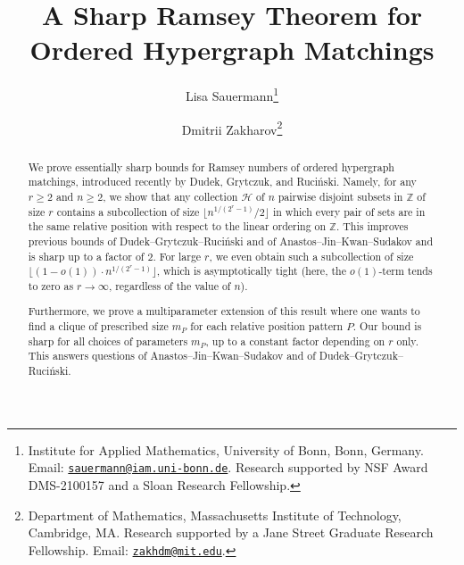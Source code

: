 \documentclass{aic}
\theoremstyle{definition}
\numberwithin{equation}{section}
\numberwithin{figure}{section}
\newcommand{\Z}{\mathbb{Z}}
\newcommand{\HH}{\mathcal{H}}
\begin{document}
\begin{frontmatter}[classification=text]

\title{A Sharp Ramsey Theorem for Ordered Hypergraph Matchings} %

\author[pgom]{Lisa Sauermann\thanks{Institute for Applied Mathematics, University of Bonn, Bonn, Germany. Email: \href{sauermann@iam.uni-bonn.de}{\nolinkurl{sauermann@iam.uni-bonn.de}}. Research supported by NSF Award DMS-2100157 and a Sloan Research Fellowship.}}
\author[johan]{Dmitrii Zakharov\thanks{Department of Mathematics, Massachusetts Institute of Technology, Cambridge, MA.  Research supported by a Jane Street Graduate Research Fellowship. 
Email: \href{zakhdm@mit.edu}{\nolinkurl{zakhdm@mit.edu}}.}}


\begin{abstract}
We prove essentially sharp bounds for Ramsey numbers of ordered hypergraph matchings, introduced recently by Dudek, Grytczuk, and Ruci\'{n}ski. Namely, for any $r \ge 2$ and $n \ge 2$, we show that any collection $\HH$ of $n$ pairwise disjoint subsets in $\Z$ of size $r$ contains a subcollection of size $\lfloor n^{1/(2^r-1)}/2\rfloor$ in which every pair of sets are in the same relative position with respect to the linear ordering on $\Z$. This improves previous bounds of Dudek--Grytczuk--Ruci\'nski and of Anastos--Jin--Kwan--Sudakov and is sharp up to a factor of $2$. For large $r$, we even obtain such a subcollection of size $\lfloor (1-o(1))\cdot n^{1/(2^r-1)}\rfloor$, which is asymptotically tight (here, the $o(1)$-term tends to zero as $r \to \infty$, regardless of the value of $n$).
    
Furthermore, we prove a multiparameter extension of this result where one wants to find a clique of prescribed size $m_P$ for each relative position pattern $P$. Our bound is sharp for all choices of parameters $m_P$, up to a constant factor depending on $r$ only. This answers questions of Anastos--Jin--Kwan--Sudakov and of Dudek--Grytczuk--Ruci\'nski.
\end{abstract}
\end{frontmatter}
\end{document}
